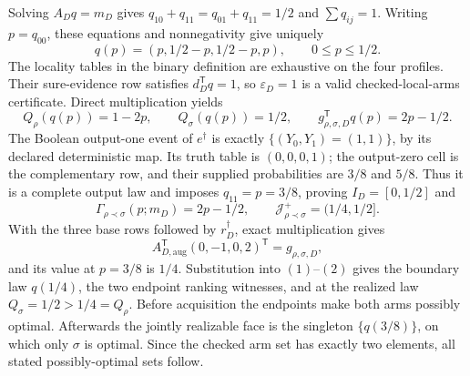 Solving \(A_Dq=m_D\) gives \(q_{10}+q_{11}=q_{01}+q_{11}=1/2\) and \(\sum q_{ij}=1\).  Writing \(p=q_{00}\), these equations and nonnegativity give uniquely
\[
q(p)=(p,1/2-p,1/2-p,p),
\qquad 0\leq p\leq1/2.
\tag{1}
\]
The locality tables in the binary definition are exhaustive on the four profiles.  Their sure-evidence row satisfies \(d_D^{\mathsf T}q=1\), so \(\varepsilon_D=1\) is a valid checked-local-arms certificate.  Direct multiplication yields
\[
Q_\rho(q(p))=1-2p,
\qquad Q_\sigma(q(p))=1/2,
\qquad g_{\rho,\sigma,D}^{\mathsf T}q(p)=2p-1/2.
\tag{2}
\]
The Boolean output-one event of \(e^\dagger\) is exactly \(\{(Y_0,Y_1)=(1,1)\}\), by its declared deterministic map.  Its truth table is \((0,0,0,1)\); the output-zero cell is the complementary row, and their supplied probabilities are \(3/8\) and \(5/8\).  Thus it is a complete output law and imposes \(q_{11}=p=3/8\), proving \(I_D=[0,1/2]\) and
\[
\Gamma_{\rho\prec\sigma}(p;m_D)=2p-1/2,
\qquad
\mathcal J_{\rho\prec\sigma}^+=(1/4,1/2].
\tag{3}
\]
With the three base rows followed by \(r_D^\dagger\), exact multiplication gives
\[
A_{D,\mathrm{aug}}^{\mathsf T}(0,-1,0,2)^{\mathsf T}
=g_{\rho,\sigma,D},
\]
and its value at \(p=3/8\) is \(1/4\).  Substitution into \((1)\)--\((2)\) gives the boundary law \(q(1/4)\), the two endpoint ranking witnesses, and at the realized law \(Q_\sigma=1/2>1/4=Q_\rho\).  Before acquisition the endpoints make both arms possibly optimal.  Afterwards the jointly realizable face is the singleton \(\{q(3/8)\}\), on which only \(\sigma\) is optimal.  Since the checked arm set has exactly two elements, all stated possibly-optimal sets follow.